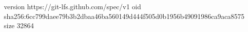 version https://git-lfs.github.com/spec/v1
oid sha256:6cc799daee79b3b2dbaa46ba560149d444f505d0b1956b49091986ca9aca8575
size 32864
